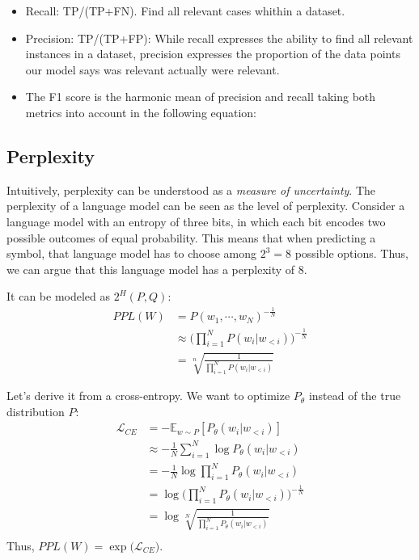 \begin{itemize}
	\item Recall: TP/(TP+FN). Find all relevant cases whithin a dataset.
	\item Precision: TP/(TP+FP): While recall expresses the ability to find all relevant instances in a dataset, precision expresses the proportion of the data points our model says was relevant actually were relevant.
	\item The F1 score is the harmonic mean of precision and recall taking both metrics into account in the following equation:
\end{itemize}

\subsection{Perplexity}

Intuitively, perplexity can be understood as a \textit{measure of uncertainty}. The perplexity of a language model can be seen as the level of perplexity. Consider a language model with an entropy of three bits, in which each bit encodes two possible outcomes of equal probability. This means that when predicting a symbol, that language model has to choose among $2^3=8$ possible options. Thus, we can argue that this language model has a perplexity of 8.

It can be modeled as $2^H(P,Q)$:
\begin{align*}
	PPL(W) &= P(w_1,\cdots, w_N)^{-\frac{1}{N}}\\
	&\approx \Bigg(\prod_{i=1}^N P(w_i|w_{<i})\Bigg)^{-\frac{1}{N}}\\
	&= \sqrt[n]{\frac{1}{\prod_{i=1}^{N} P(w_{i}|w_{<i})}}
\end{align*}

Let's derive it from a cross-entropy. We want to optimize $P_\theta$ instead of the true distribution $P$:
\begin{align}
	\mathcal{L}_{CE} &= -\mathbb{E}_{w\sim P} [P_\theta(w_{i}|w_{<i})]\\
	&\approx -\frac{1}{N} \sum_{i=1}^{N} \log P_\theta(w_{i}|w_{<i})\\
	&= -\frac{1}{N} \log \prod_{i=1}^{N} P_\theta(w_{i}|w_{<i})\\
	&=  \log \Bigg(\prod_{i=1}^{N} P_\theta(w_{i}|w_{<i}) \Bigg)^{-\frac{1}{N}}\\
	&=  \log \sqrt[N]{\frac{1}{\prod_{i=1}^{N} P_\theta(w_{i}|w_{<i})}}\\
	\label{eq:ppl_entropy}
\end{align}
Thus, $PPL(W) = \exp\Big(\mathcal{L}_{CE}\Big).$

